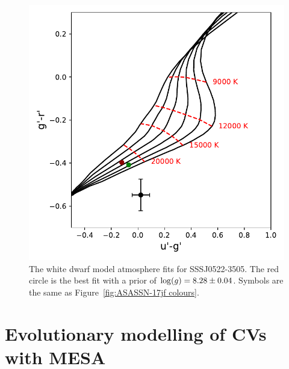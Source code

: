 \begin{figure}
    \centering
    \includegraphics[width=\columnwidth, trim={0 0 0 0}, clip]{figures/results/three_cvs_with_weird_colours/SSS111126/PhysicalParams/SSS111126_colourPlot_alpha_beta.pdf}
    \caption{The white dwarf model atmosphere fits for SSSJ0522-3505. The red circle is the best fit with a prior of ${\rm log}(g)=8.28\pm0.04$. Symbols are the same as Figure~\ref{fig:ASASSN-17jf colours}.}
    \label{fig:SSSJ0522-3505 colours}
\end{figure}



\section{Evolutionary modelling of CVs with MESA}




